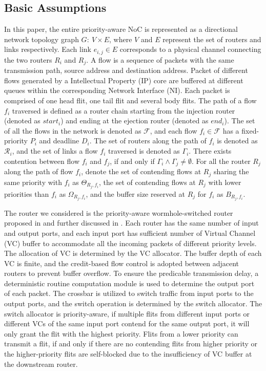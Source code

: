 \documentclass[preprint]{elsarticle}
\begin{document}
\subsection{Basic Assumptions}
In this paper, the entire priority-aware NoC is represented as a directional network topology graph $G:\ V\times E$, where $V$ and $E$ represent the set of routers and links respectively. Each link $e_{i,j}\in E$ corresponds to a physical channel connecting the two routers $R_i$ and $R_j$. A flow is a sequence of packets with the same transmission path, source address and destination address. Packet of different flows generated by a Intellectual Property (IP) core are buffered at different queues within the corresponding Network Interface (NI). Each packet is comprised of one head flit, one tail flit and several body flits. The path of a flow $f_i$ traversed is defined as a router chain starting from the injection router (denoted as $start_i$) and ending at the ejection router (denoted as $end_i$). The set of all the flows in the network is denoted as $\mathcal{F}$, and each flow $f_i\in\mathcal{F}$ has a fixed-priority $P_i$ and deadline $D_i$. The set of routers along the path of $f_i$ is denoted as $\mathcal{R}_i$, and the set of links a flow $f_i$ traversed is denoted as $\Gamma_i$. There exists contention between flow $f_i$ and $f_j$, if and only if $\Gamma_i\wedge\Gamma_j\neq\emptyset$. For all the router $R_j$ along the path of flow $f_i$, denote the set of contending flows at $R_j$ sharing the same priority with $f_i$ as $\Theta_{R_j,f_i}$, the set of contending flows at $R_j$ with lower priorities than $f_i$ as $\Omega_{R_j,f_i}$, and the buffer size reserved at $R_j$ for $f_i$ as $B_{R_j,f_i}$.

The router we considered is the priority-aware wormhole-switched router proposed in \cite{Shi:2008:RCA:1397757.1397996} and further discussed in \cite{627905}\cite{707545}\cite{73}. Each router has the same number of input and output ports, and each input port has sufficient number of Virtual Channel (VC) buffer to accommodate all the incoming packets of different priority levels. The allocation of VC is determined by the VC allocator. The buffer depth of each VC is finite, and the credit-based flow control \cite{DaTo04} is adopted between adjacent routers to prevent buffer overflow. To ensure the predicable transmission delay, a deterministic routine computation module is used to determine the output port of each packet. The crossbar is utilized to switch traffic from input ports to the output ports, and the switch operation is determined by the switch allocator. The switch allocator is priority-aware, if multiple flits from different input ports or different VCs of the same input port contend for the same output port, it will only grant the flit with the highest priority. Flits from a lower priority can transmit a flit, if and only if there are no contending flits from higher priority or the higher-priority flits are self-blocked due to the insufficiency of VC buffer at the downstream router.
\end{document}
